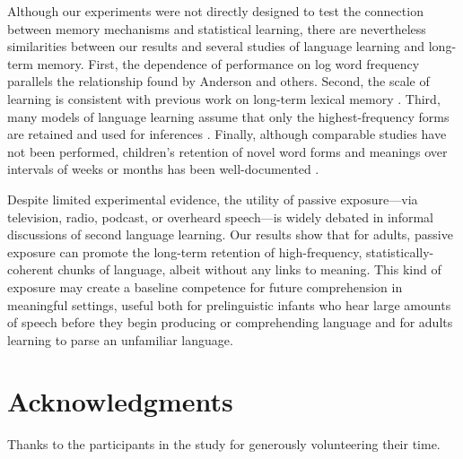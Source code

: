 \documentclass[10pt]{article}
\begin{document}
Although our experiments were not directly designed to test the connection between memory mechanisms and statistical learning, there are nevertheless similarities between our results and several studies of language learning and long-term memory. First, the dependence of performance on log word frequency parallels the relationship found by Anderson \cite{anderson1990} and others. Second, the scale of learning is consistent with previous work on long-term lexical memory \cite{bahrick1993}. Third, many models of language learning assume that only the highest-frequency forms are retained and used for inferences \cite{swingley2005,mintz1995}. Finally, although comparable studies have not been performed, children's retention of novel word forms and meanings over intervals of weeks or months has been well-documented \cite{markson1997,jusczyk1997}.

Despite limited experimental evidence, the utility of passive exposure---via television, radio, podcast, or overheard speech---is widely debated in informal discussions of second language learning. Our results show that for adults, passive exposure can promote the long-term retention of high-frequency, statistically-coherent chunks of language, albeit without any links to meaning. This kind of exposure may create a baseline competence for future comprehension in meaningful settings, useful both for prelinguistic infants who hear large amounts of speech before they begin producing or comprehending language and for adults learning to parse an unfamiliar language.

\section*{Acknowledgments}

Thanks to the participants in the study for generously volunteering their time. 


\end{document}
